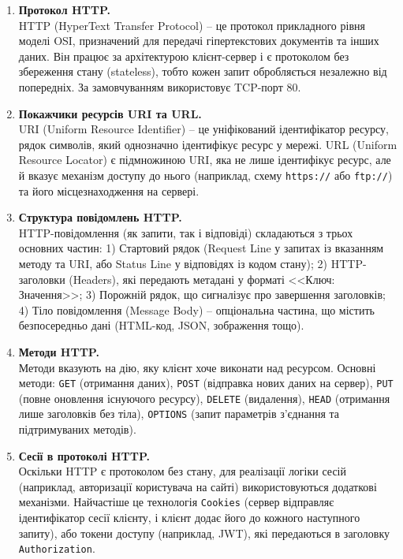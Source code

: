 \documentclass[14pt, a4paper]{extreport}
\begin{document}
	\begin{enumerate}
		\item \textbf{Протокол HTTP.} \\ HTTP (HyperText Transfer Protocol) -- це протокол прикладного рівня моделі OSI, призначений для передачі гіпертекстових документів та інших даних. Він працює за архітектурою клієнт-сервер і є протоколом без збереження стану (stateless), тобто кожен запит обробляється незалежно від попередніх. За замовчуванням використовує TCP-порт 80.
		
		\item \textbf{Покажчики ресурсів URI та URL.} \\ URI (Uniform Resource Identifier) -- це уніфікований ідентифікатор ресурсу, рядок символів, який однозначно ідентифікує ресурс у мережі. URL (Uniform Resource Locator) є підмножиною URI, яка не лише ідентифікує ресурс, але й вказує механізм доступу до нього (наприклад, схему \texttt{https://} або \texttt{ftp://}) та його місцезнаходження на сервері.
		
		\item \textbf{Структура повідомлень HTTP.} \\ HTTP-повідомлення (як запити, так і відповіді) складаються з трьох основних частин: 1) Стартовий рядок (Request Line у запитах із вказанням методу та URI, або Status Line у відповідях із кодом стану); 2) HTTP-заголовки (Headers), які передають метадані у форматі <<Ключ: Значення>>; 3) Порожній рядок, що сигналізує про завершення заголовків; 4) Тіло повідомлення (Message Body) -- опціональна частина, що містить безпосередньо дані (HTML-код, JSON, зображення тощо).
		
		\item \textbf{Методи HTTP.} \\ Методи вказують на дію, яку клієнт хоче виконати над ресурсом. Основні методи: \texttt{GET} (отримання даних), \texttt{POST} (відправка нових даних на сервер), \texttt{PUT} (повне оновлення існуючого ресурсу), \texttt{DELETE} (видалення), \texttt{HEAD} (отримання лише заголовків без тіла), \texttt{OPTIONS} (запит параметрів з'єднання та підтримуваних методів).
		
		\item \textbf{Сесії в протоколі HTTP.} \\ Оскільки HTTP є протоколом без стану, для реалізації логіки сесій (наприклад, авторизації користувача на сайті) використовуються додаткові механізми. Найчастіше це технологія \texttt{Cookies} (сервер відправляє ідентифікатор сесії клієнту, і клієнт додає його до кожного наступного запиту), або токени доступу (наприклад, JWT), які передаються в заголовку \texttt{Authorization}.
		

\end{enumerate}
\end{document}
